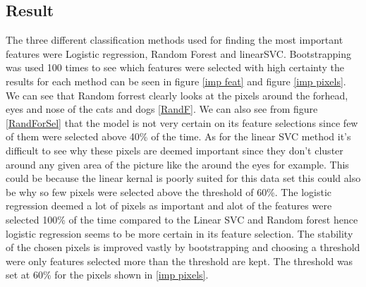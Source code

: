 \documentclass{article}
\begin{document}
\subsection{Result}
The three different classification methods used for finding the most important features were Logistic regression, Random Forest and linearSVC. Bootstrapping was used 100 times to see which features were selected with high certainty the results for each method can be seen in figure \ref{imp feat} and figure \ref{imp pixels}. We can see that Random forrest clearly looks at the pixels around the forhead, eyes and nose of the cats and dogs \ref{RandF}. We can also see from figure \ref{RandForSel} that the model is not very certain on its feature selections since few of them were selected above 40\% of the time. As for the linear SVC method it's difficult to see why these pixels are deemed important since they don't cluster around any given area of the picture like the around the eyes for example. This could be because the linear kernal is poorly suited for this data set this could also be why so few pixels were selected above the threshold of 60\%. The logistic regression deemed a lot of pixels as important and alot of the features were selected 100\% of the time compared to the Linear SVC and Random forest hence logistic regression seems to be more certain in its feature selection.  The stability of the chosen pixels is improved vastly by bootstrapping and choosing a threshold were only features selected more than the threshold are kept. The threshold was set at 60\% for the pixels shown in \ref{imp pixels}.
\end{document}
